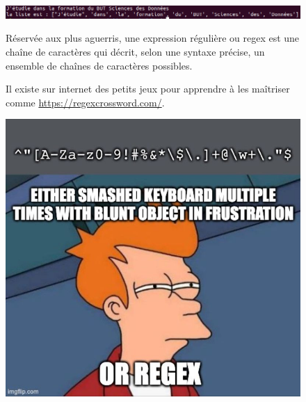 \begin{figure}[H]
    \centering
    \includegraphics[scale = 0.5]{chapitre2/figures/string.png}
\end{figure}

\begin{tcolorbox}[lefttitle=2cm, colframe=gray!75!blue, title= \textbf{Tip for Code 2 : "\textit{Les expressions régulières}"}]

\begin{figure}[H]
    \begin{minipage}[c]{0.4\textwidth}
    Réservée aux plus aguerris, une expression régulière ou regex est une chaîne de caractères qui décrit, selon une syntaxe précise, un ensemble de chaînes de caractères possibles.

    Il existe sur internet des petits jeux pour apprendre à les maîtriser comme \url{https://regexcrossword.com/}.
    \end{minipage}\hfill
    \begin{minipage}[c]{0.5\textwidth}
    \includegraphics[scale=0.27]{chapitre2/figures/regex.jpeg}
    \end{minipage}
\end{figure}

\end{tcolorbox}



